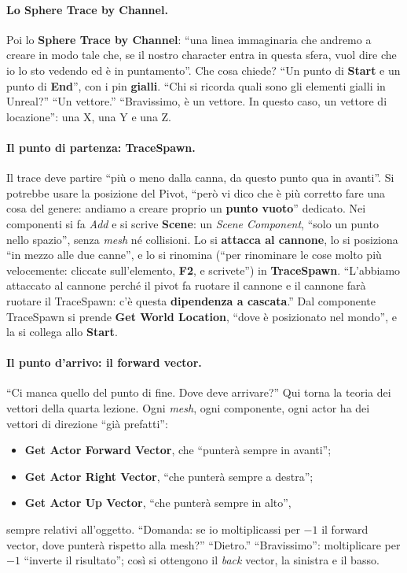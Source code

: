 \paragraph{Lo Sphere Trace by Channel.} Poi lo \textbf{Sphere Trace by Channel}: ``una
linea immaginaria che andremo a creare in modo tale che, se il nostro character entra in
questa sfera, vuol dire che io lo sto vedendo ed è in puntamento''. Che cosa chiede?
``Un punto di \textbf{Start} e un punto di \textbf{End}'', con i pin
\textbf{gialli}. ``Chi si ricorda quali sono gli elementi gialli in Unreal?'' ``Un
vettore.'' ``Bravissimo, è un vettore. In questo caso, un vettore di locazione'': una X,
una Y e una Z.

\paragraph{Il punto di partenza: TraceSpawn.} Il trace deve partire ``più o meno dalla
canna, da questo punto qua in avanti''. Si potrebbe usare la posizione del Pivot, ``però
vi dico che è più corretto fare una cosa del genere: andiamo a creare proprio un
\textbf{punto vuoto}'' dedicato. Nei componenti si fa \emph{Add} e si scrive
\textbf{Scene}: un \emph{Scene Component}, ``solo un punto nello spazio'', senza
\emph{mesh} né collisioni. Lo si \textbf{attacca al cannone}, lo si posiziona ``in
mezzo alle due canne'', e lo si rinomina (``per rinominare le cose molto più
velocemente: cliccate sull'elemento, \textbf{F2}, e scrivete'') in
\textbf{TraceSpawn}. ``L'abbiamo attaccato al cannone perché il pivot fa ruotare il
cannone e il cannone farà ruotare il TraceSpawn: c'è questa \textbf{dipendenza a
cascata}.'' Dal componente TraceSpawn si prende \textbf{Get World Location}, ``dove è
posizionato nel mondo'', e la si collega allo \textbf{Start}.

\paragraph{Il punto d'arrivo: il forward vector.} ``Ci manca quello del punto di fine.
Dove deve arrivare?'' Qui torna la teoria dei vettori della quarta lezione. Ogni
\emph{mesh}, ogni componente, ogni actor ha dei vettori di direzione ``già prefatti'':
\begin{itemize}
  \item \textbf{Get Actor Forward Vector}, che ``punterà sempre in avanti'';
  \item \textbf{Get Actor Right Vector}, ``che punterà sempre a destra'';
  \item \textbf{Get Actor Up Vector}, ``che punterà sempre in alto'',
\end{itemize}
sempre relativi all'oggetto. ``Domanda: se io moltiplicassi per $-1$ il forward vector,
dove punterà rispetto alla mesh?'' ``Dietro.'' ``Bravissimo'': moltiplicare per $-1$
``inverte il risultato''; così si ottengono il \emph{back} vector, la sinistra e il
basso.

